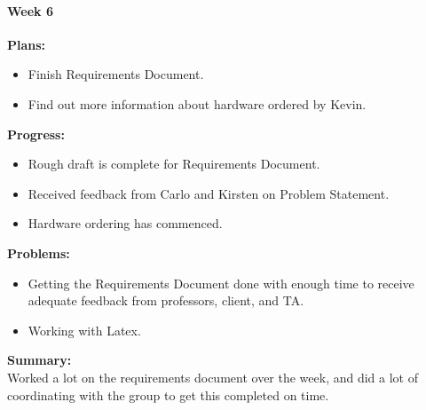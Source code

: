 \paragraph{Week 6}
\begin{adjustwidth}{2.5em}{0pt}
    \vspace{-0.5cm}\textbf{Plans:}
    \vspace{-0.5cm}
    \begin{itemize}
        \item Finish Requirements Document.
		\item Find out more information about hardware ordered by Kevin.
    \end{itemize} 
    \vspace{-0.3cm}\textbf{Progress:}
    \vspace{-0.5cm}
    \begin{itemize}
        \item Rough draft is complete for Requirements Document.
		\item Received feedback from Carlo and Kirsten on Problem Statement.
		\item Hardware ordering has commenced. 
    \end{itemize} 
    \vspace{-0.3cm}\textbf{Problems:}
    \vspace{-0.5cm}
    \begin{itemize}
        \item Getting the Requirements Document done with enough time to receive adequate feedback from professors, client, and TA. 
		\item Working with Latex.
    \end{itemize}  
    \vspace{-0.3cm}\noindent\textbf{Summary:}\\
    \noindent Worked a lot on the requirements document over the week, and did a lot of coordinating with the group to get this completed on time.
\end{adjustwidth} 


